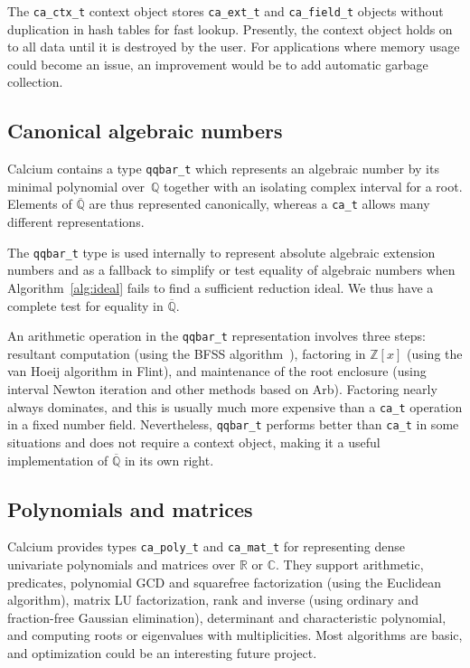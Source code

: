 \documentclass[11pt,a4paper]{article}
\begin{document}
The \texttt{ca\_ctx\_t} context object stores
\texttt{ca\_ext\_t} and \texttt{ca\_field\_t} objects
without duplication
in hash tables for fast lookup.
Presently, the context object holds on to all data
until it is destroyed by the user. For applications where memory usage could become
an issue, an improvement would be to add
automatic garbage collection.

\subsection{Canonical algebraic numbers}

Calcium contains
a type \texttt{qqbar\_t} which represents an algebraic number by its 
minimal polynomial over~$\mathbb{Q}$ together with an
isolating complex interval for a root.
Elements of $\overline{\mathbb{Q}}$ are thus represented canonically,
whereas a \texttt{ca\_t} allows many different representations.

The \texttt{qqbar\_t} type is used internally to represent
absolute algebraic extension numbers
and as a fallback
to simplify or test equality of algebraic numbers when Algorithm~\ref{alg:ideal}
fails to find a sufficient reduction ideal.
We thus have a complete test for equality in $\overline{\mathbb{Q}}$.

An arithmetic operation in the \texttt{qqbar\_t} representation involves three steps:
resultant computation (using the BFSS algorithm~\cite{Bos2006}), factoring in $\mathbb{Z}[x]$ (using the van Hoeij algorithm in Flint),
and maintenance of the root enclosure (using interval Newton iteration and other methods based on Arb).
Factoring
nearly always dominates, and this is usually much more expensive
than a \texttt{ca\_t} operation in a fixed number field.
Nevertheless, \texttt{qqbar\_t} performs better than \texttt{ca\_t}
in some situations
and does not require a context object, making it a useful implementation of $\overline{\mathbb{Q}}$
in its own right.

\subsection{Polynomials and matrices}

Calcium provides types \texttt{ca\_poly\_t} and \texttt{ca\_mat\_t}
for representing dense univariate polynomials and matrices over $\mathbb{R}$
or $\mathbb{C}$.
They support arithmetic, predicates,
polynomial GCD and squarefree factorization (using the Euclidean algorithm),
matrix LU factorization, rank and inverse (using ordinary and fraction-free Gaussian elimination),
determinant and characteristic polynomial,
and computing roots or eigenvalues with
multiplicities. Most algorithms are basic,
and optimization could be an interesting future project.
\end{document}
